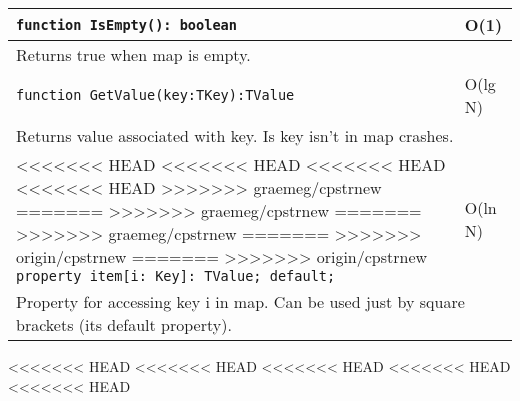 \begin{longtable}{|m{10cm}|m{5cm}|}
\verb!function IsEmpty(): boolean! & O(1) \\ \hline
\multicolumn{2}{|m{15cm}|}{Returns true when map is empty.} \\\hline

\verb!function GetValue(key:TKey):TValue! & O(lg N) \\\hline
\multicolumn{2}{|m{15cm}|}{Returns value associated with key. Is key isn't in map crashes.} \\\hline

<<<<<<< HEAD
<<<<<<< HEAD
<<<<<<< HEAD
<<<<<<< HEAD
>>>>>>> graemeg/cpstrnew
=======
>>>>>>> graemeg/cpstrnew
=======
>>>>>>> graemeg/cpstrnew
=======
>>>>>>> origin/cpstrnew
=======
>>>>>>> origin/cpstrnew
\verb!property item[i: Key]: TValue; default;! & O(ln N) \\\hline
\multicolumn{2}{|m{15cm}|}{Property for accessing key i in map. Can be used just by square
brackets (its default property).} \\\hline\hline


\end{longtable}
<<<<<<< HEAD
<<<<<<< HEAD
<<<<<<< HEAD
<<<<<<< HEAD
<<<<<<< HEAD

